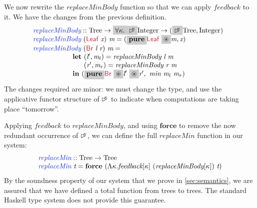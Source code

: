 \documentclass[natbib]{sigplanconf}
\newcommand{\cons}[1]{\textcolor{cons}{\textsf{#1}}}
\newcommand{\kw}[1]{\textbf{#1}}
\newcommand{\tyname}[1]{\textrm{#1}}
\newcommand{\ident}[1]{\textit{#1}}
\newcommand{\defn}[1]{\textcolor{defnd}{\ident{#1}}}
\newcommand{\delay}[1]{\mathord{\rhd\kern-0.4em^{#1}}}
\begin{document}
We now rewrite the $\ident{replaceMinBody}$ function so that we can
apply $\ident{feedback}$ to it. We have  the
changes from the previous definition.
\begin{displaymath}
  \begin{array}{@{}l}
    \defn{replaceMinBody} :: \tyname{Tree} \to \hlchangem{\forall \kappa.}\hlchangem{\delay\kappa}\tyname{Integer} \to (\hlchangem{\delay\kappa}\tyname{Tree},\tyname{Integer}) \\
    \hspace{0cm} \defn{replaceMinBody}\ (\cons{Leaf}\ \ident{x})\ \ident{m} = (\hlchangem{\kw{pure}}\cons{Leaf}\ \hlchangem{\circledast}\ident{m}, \ident{x}) \\
    \hspace{0cm} \defn{replaceMinBody}\ (\cons{Br}\ \ident{l}\ \ident{r})\ \ident{m} = \\
    \hspace{2cm} \kw{let}\ (\ident{l$'$}, \ident{m$_l$}) = \ident{replaceMinBody}\ \ident{l}\ \ident{m} \\
    \hspace{2cm} \textcolor{white}{\kw{let}\ }(\ident{r$'$}, \ident{m$_r$}) = \ident{replaceMinBody}\ \ident{r}\ \ident{m} \\
    \hspace{2cm} \kw{in}\ (\hlchangem{\kw{pure}}\cons{Br}\ \hlchangem{\circledast}\ident{l$'$}\ \hlchangem{\circledast}\ident{r$'$},\ \ident{min}\ \ident{m$_l$}\ \ident{m$_r$})
  \end{array}
\end{displaymath}
The changes required are minor: we must change the type, and use the
applicative functor structure of $\delay\kappa$ to indicate when
computations are taking place ``tomorrow''.

Applying $\ident{feedback}$ to $\ident{replaceMinBody}$, and using
$\kw{force}$ to remove the now redundant occurrence of $\delay\kappa$,
we can define the full $\ident{replaceMin}$ function in our system:
\begin{displaymath}
  \begin{array}{l}
    \defn{replaceMin} :: \tyname{Tree} \to \tyname{Tree} \\
    \defn{replaceMin}\ \ident{t} = \kw{force}\ (\Lambda \kappa. \ident{feedback}[\kappa]\ (\ident{replaceMinBody}[\kappa])\ \ident{t})
  \end{array}
\end{displaymath}
By the soundness property of our system that we prove in
\autoref{sec:semantics}, we are assured that we have defined a total
function from trees to trees. The standard Haskell type system does
not provide this guarantee.
\end{document}
